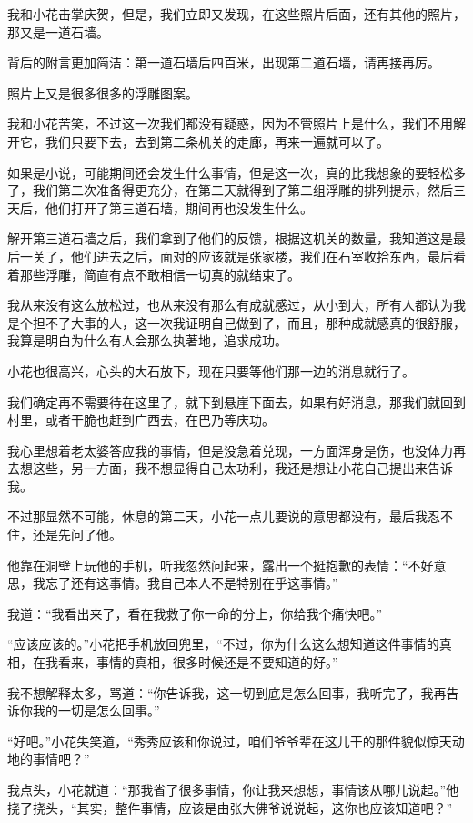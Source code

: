 我和小花击掌庆贺，但是，我们立即又发现，在这些照片后面，还有其他的照片，那又是一道石墙。

背后的附言更加简洁：第一道石墙后四百米，出现第二道石墙，请再接再厉。

照片上又是很多很多的浮雕图案。

我和小花苦笑，不过这一次我们都没有疑惑，因为不管照片上是什么，我们不用解开它，我们只要下去，去到第二条机关的走廊，再来一遍就可以了。

如果是小说，可能期间还会发生什么事情，但是这一次，真的比我想象的要轻松多了，我们第二次准备得更充分，在第二天就得到了第二组浮雕的排列提示，然后三天后，他们打开了第三道石墙，期间再也没发生什么。

解开第三道石墙之后，我们拿到了他们的反馈，根据这机关的数量，我知道这是最后一关了，他们进去之后，面对的应该就是张家楼，我们在石室收拾东西，最后看着那些浮雕，简直有点不敢相信一切真的就结束了。

我从来没有这么放松过，也从来没有那么有成就感过，从小到大，所有人都认为我是个担不了大事的人，这一次我证明自己做到了，而且，那种成就感真的很舒服，我算是明白为什么有人会那么执著地，追求成功。

小花也很高兴，心头的大石放下，现在只要等他们那一边的消息就行了。

我们确定再不需要待在这里了，就下到悬崖下面去，如果有好消息，那我们就回到村里，或者干脆也赶到广西去，在巴乃等庆功。

我心里想着老太婆答应我的事情，但是没急着兑现，一方面浑身是伤，也没体力再去想这些，另一方面，我不想显得自己太功利，我还是想让小花自己提出来告诉我。

不过那显然不可能，休息的第二天，小花一点儿要说的意思都没有，最后我忍不住，还是先问了他。

他靠在洞壁上玩他的手机，听我忽然问起来，露出一个挺抱歉的表情：“不好意思，我忘了还有这事情。我自己本人不是特别在乎这事情。”

我道：“我看出来了，看在我救了你一命的分上，你给我个痛快吧。”

“应该应该的。”小花把手机放回兜里，“不过，你为什么这么想知道这件事情的真相，在我看来，事情的真相，很多时候还是不要知道的好。”

我不想解释太多，骂道：“你告诉我，这一切到底是怎么回事，我听完了，我再告诉你我的一切是怎么回事。”

“好吧。”小花失笑道，“秀秀应该和你说过，咱们爷爷辈在这儿干的那件貌似惊天动地的事情吧？”

我点头，小花就道：“那我省了很多事情，你让我来想想，事情该从哪儿说起。”他挠了挠头，“其实，整件事情，应该是由张大佛爷说说起，这你也应该知道吧？”

